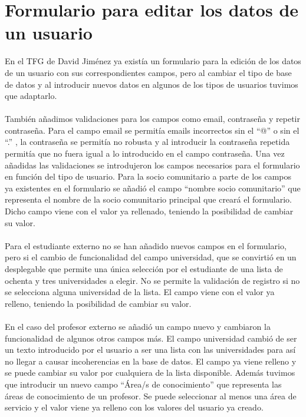 \documentclass[11pt]{book}
\begin{document}
\section{Formulario para editar los datos de un usuario}
En el TFG de David Jiménez ya existía un formulario para la edición de los datos de un usuario con sus correspondientes campos, pero al cambiar el tipo de base de datos y al introducir nuevos datos en algunos de los tipos de usuarios tuvimos que adaptarlo. \\\\
También añadimos validaciones para los campos como email, contraseña y repetir contraseña. Para el campo email se permitía emails incorrectos sin el “@” o sin el “.” , la contraseña se permitía no robusta y al introducir la contraseña repetida permitía que no fuera igual a lo introducido en el campo contraseña. Una vez añadidas las validaciones se introdujeron los campos necesarios para el formulario en función del tipo de usuario.
Para la socio comunitario a parte de los campos ya existentes en el formulario se añadió el campo “nombre socio comunitario” que representa el nombre de la socio comunitario principal que creará el formulario. Dicho campo viene con el valor ya rellenado, teniendo la posibilidad de cambiar su valor.\\\\
Para el estudiante externo no se han añadido nuevos campos en el formulario, pero si el cambio de funcionalidad del campo universidad, que se convirtió en un desplegable que permite una única selección por el estudiante de una lista de ochenta y tres universidades a elegir.  No se permite la validación de registro si no se selecciona alguna universidad de la lista. El campo  viene con el valor ya relleno, teniendo la posibilidad de cambiar su valor.\\\\
En el caso del profesor externo se añadió un campo nuevo y cambiaron la funcionalidad de algunos otros campos más. El campo universidad cambió de ser un texto introducido por el usuario a ser una lista con las universidades para así no llegar a causar incoherencias en la base de datos. El campo ya viene relleno y se puede cambiar su valor por cualquiera de la lista disponible. Además tuvimos que introducir un nuevo campo “Área/s de conocimiento” que representa las áreas de conocimiento de un profesor. Se puede seleccionar al menos una área de servicio y el valor viene ya relleno con los valores del usuario ya creado.
\end{document}
